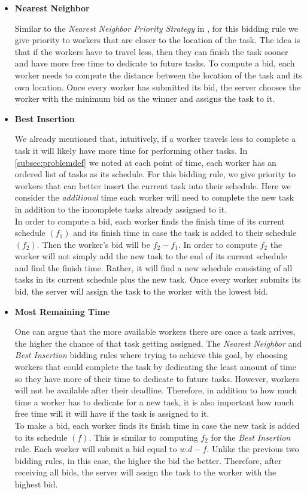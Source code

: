 \begin{itemize}

\item \textbf{Nearest Neighbor}

Similar to the \textit{Nearest Neighbor Priority Strategy} in \cite{Kazemi12}, for this bidding rule we give priority to workers that are closer to the location of the task. The idea is that if the workers have to travel less, then they can finish the task sooner and have more free time to dedicate to future tasks. To compute a bid, each worker needs to compute the distance between the location of the task and its own location. Once every worker has submitted its bid, the server chooses the worker with the minimum bid as the winner and assigns the task to it.

\item \textbf{Best Insertion}

We already mentioned that, intuitively, if a worker travels less to complete a task it will likely have more time for performing other tasks. In \cref{subsec:problemdef} we noted at each point of time, each worker has an ordered list of tasks as its schedule. For this bidding rule, we give priority to workers that can better insert the current task into their schedule. Here we consider the \textit{additional} time each worker will need to complete the new task in addition to the incomplete tasks already assigned to it.\\
In order to compute a bid, each worker finds the finish time of its current schedule $(f_1)$ and its finish time in case the task is added to their schedule $(f_2)$. Then the worker's bid will be $f_2 - f_1$. In order to compute $f_2$ the worker will not simply add the new task to the end of its current schedule and find the finish time. Rather, it will find a new schedule consisting of all tasks in its current schedule plus the new task.
Once every worker submits its bid, the server will assign the task to the worker with the lowest bid.

\item \textbf{Most Remaining Time}

One can argue that the more available workers there are once a task arrives, the higher the chance of that task getting assigned. The \textit{Nearest Neighbor} and \textit{Best Insertion} bidding rules where trying to achieve this goal, by choosing workers that could complete the task by dedicating the least amount of time so they have more of their time to dedicate to future tasks. However, workers will not be available after their deadline. Therefore, in addition to how much time a worker has to dedicate for a new task, it is also important how much free time will it will have if the task is assigned to it.\\
To make a bid, each worker finds its finish time in case the new task is added to its schedule $(f)$. This is similar to computing $f_2$ for the \textit{Best Insertion} rule. Each worker will submit a bid equal to $w.d - f$. Unlike the previous two bidding rules, in this case, the higher the bid the better. Therefore, after receiving all bids, the server will assign the task to the worker with the highest bid.


\end{itemize}
